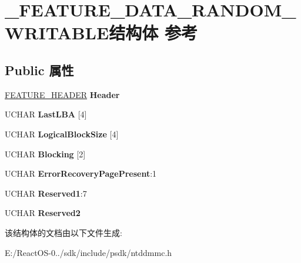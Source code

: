 \hypertarget{struct___f_e_a_t_u_r_e___d_a_t_a___r_a_n_d_o_m___w_r_i_t_a_b_l_e}{}\section{\+\_\+\+F\+E\+A\+T\+U\+R\+E\+\_\+\+D\+A\+T\+A\+\_\+\+R\+A\+N\+D\+O\+M\+\_\+\+W\+R\+I\+T\+A\+B\+L\+E结构体 参考}
\label{struct___f_e_a_t_u_r_e___d_a_t_a___r_a_n_d_o_m___w_r_i_t_a_b_l_e}
\subsection*{Public 属性}
\begin{DoxyCompactItemize}
\item 
\mbox{\label{struct___f_e_a_t_u_r_e___d_a_t_a___r_a_n_d_o_m___w_r_i_t_a_b_l_e_ae3ac621420cc653f58b9933af9aecd2a}} 
\hyperlink{struct___f_e_a_t_u_r_e___h_e_a_d_e_r}{F\+E\+A\+T\+U\+R\+E\+\_\+\+H\+E\+A\+D\+ER} {\bfseries Header}
\item 
\mbox{\label{struct___f_e_a_t_u_r_e___d_a_t_a___r_a_n_d_o_m___w_r_i_t_a_b_l_e_a5c36aa6a8c89cc74f8d4f25e9fe54ac2}} 
U\+C\+H\+AR {\bfseries Last\+L\+BA} \mbox{[}4\mbox{]}
\item 
\mbox{\label{struct___f_e_a_t_u_r_e___d_a_t_a___r_a_n_d_o_m___w_r_i_t_a_b_l_e_aad01d28bc59f485c6347e3109546772c}} 
U\+C\+H\+AR {\bfseries Logical\+Block\+Size} \mbox{[}4\mbox{]}
\item 
\mbox{\label{struct___f_e_a_t_u_r_e___d_a_t_a___r_a_n_d_o_m___w_r_i_t_a_b_l_e_a08829edfb98800a461215b77176d2df6}} 
U\+C\+H\+AR {\bfseries Blocking} \mbox{[}2\mbox{]}
\item 
\mbox{\label{struct___f_e_a_t_u_r_e___d_a_t_a___r_a_n_d_o_m___w_r_i_t_a_b_l_e_af1d1af9d5b05ca5213c352f00c5d523e}} 
U\+C\+H\+AR {\bfseries Error\+Recovery\+Page\+Present}\+:1
\item 
\mbox{\label{struct___f_e_a_t_u_r_e___d_a_t_a___r_a_n_d_o_m___w_r_i_t_a_b_l_e_a41c285f50399df5d5045c1f07cf1a535}} 
U\+C\+H\+AR {\bfseries Reserved1}\+:7
\item 
\mbox{\label{struct___f_e_a_t_u_r_e___d_a_t_a___r_a_n_d_o_m___w_r_i_t_a_b_l_e_abfc0fece231284d249ae145a54c6f325}} 
U\+C\+H\+AR {\bfseries Reserved2}
\end{DoxyCompactItemize}


该结构体的文档由以下文件生成\+:\begin{DoxyCompactItemize}
\item 
E\+:/\+React\+O\+S-\/0../sdk/include/psdk/ntddmmc.\+h\end{DoxyCompactItemize}

